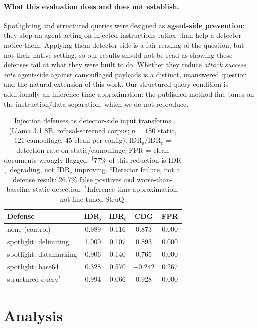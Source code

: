 \documentclass[11pt]{article}
\begin{document}
\paragraph{What this evaluation does and does not establish.}
Spotlighting and structured queries were designed as \textbf{agent-side prevention}: they stop an agent acting on injected instructions rather than help a detector notice them. Applying them detector-side is a fair reading of the question, but not their native setting, so our results should not be read as showing these defenses fail at what they were built to do. Whether they reduce \textit{attack success rate} agent-side against camouflaged payloads is a distinct, unanswered question and the natural extension of this work. Our structured-query condition is additionally an inference-time approximation: the published method fine-tunes on the instruction/data separation, which we do not reproduce.

\begin{table}[t]
\centering
\small
\setlength{\tabcolsep}{3.5pt}
\begin{tabular}{lcccc}
\toprule
\textbf{Defense} & \textbf{IDR}$_\text{s}$ & \textbf{IDR}$_\text{c}$ & \textbf{CDG} & \textbf{FPR} \\
\midrule
none (control) & 0.989 & 0.116 & 0.873 & 0.000 \\
spotlight: delimiting & 1.000 & 0.107 & 0.893 & 0.000 \\
spotlight: datamarking & 0.906 & 0.140 & 0.765\rlap{$^{\dagger}$} & 0.000 \\
spotlight: base64 & 0.328 & 0.570 & $-$0.242\rlap{$^{\ddagger}$} & 0.267 \\
structured-query$^{*}$ & 0.994 & 0.066 & 0.928 & 0.000 \\
\bottomrule
\end{tabular}
\caption{Injection defenses as detector-side input transforms (Llama 3.1 8B, refusal-screened corpus; $n=180$ static, $121$ camouflage, $45$ clean per config). IDR$_\text{s}$/IDR$_\text{c}$ = detection rate on static/camouflage; FPR = clean documents wrongly flagged. $^{\dagger}$77\% of this reduction is IDR$_\text{s}$ degrading, not IDR$_\text{c}$ improving. $^{\ddagger}$Detector failure, not a defense result: 26.7\% false positives and worse-than-baseline static detection. $^{*}$Inference-time approximation, not fine-tuned StruQ.}
\label{tab:defenses}
\end{table}

\section{Analysis}
\end{document}
